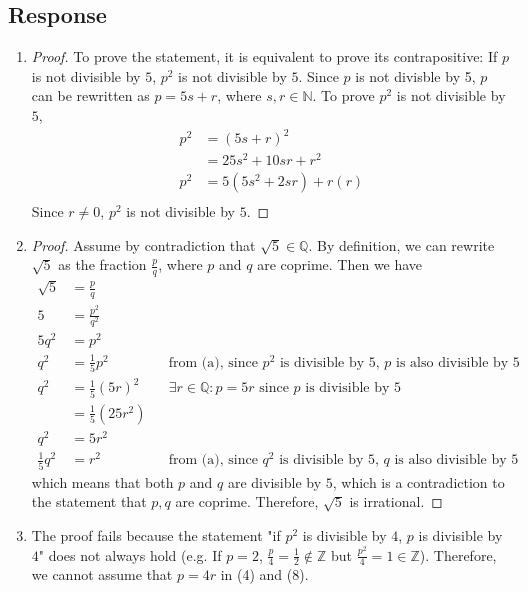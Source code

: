 \documentclass[13pt]{article}
\begin{document}
\subsection*{Response}
\begin{enumerate}[label=(\alph*)]
\item
  \begin{proof}
    To prove the statement, it is equivalent to prove its contrapositive: If $p$ is not divisible by $5$,
    $p^2$ is not divisible by $5$. Since $p$ is not divisble by 5, $p$ can be rewritten as $p = 5s + r$, where
    $s, r \in \mathbb{N}$. To prove $p^2$ is not divisible by $5$,
    \begin{align*}
      p^2 &= (5s + r)^2 \\
          &= 25s^2 + 10sr + r^2 \\
      p^2 &= 5(5s^2 + 2sr) + r(r) \\
    \end{align*}
    Since $r \neq 0$, $p^2$ is not divisible by $5$.
  \end{proof}
\item
  \begin{proof}
    Assume by contradiction that $\sqrt{5} \in \mathbb{Q}$. By definition,
    we can rewrite $\sqrt{5}$ as the fraction $\frac{p}{q}$, where $p$ and $q$ are coprime. Then we have
    \begin{align}
      \sqrt{5} &= \frac{p}{q} \\
      5 &= \frac{p^2}{q^2} \\
      5q^2 &= p^2 \\
      q^2 &= \frac{1}{5}p^2 && \text{from (a), since $p^2$ is divisible by 5, $p$ is also divisible by
                               5} \\
      q^2 &= \frac{1}{5}(5r)^2 && \exists r \in \mathbb{Q} : p = 5r \text{ since $p$ is divisible by 5} \\
               &= \frac{1}{5}(25r^2) \\
      q^2 &= 5r^2 \\
      \frac{1}{5}q^2 &= r^2 && \text{from (a), since $q^2$ is divisible by 5, $q$ is also divisible by
                               5}
    \end{align}
    which means that both $p$ and $q$ are divisible by $5$, which is a contradiction to the statement that
    $p, q$ are coprime. Therefore, $\sqrt{5}$ is irrational.
  \end{proof}
\item The proof fails because the statement "if $p^2$ is divisible by $4$, $p$ is divisible by $4$"
  does not always hold (e.g. If $p = 2$, $\frac{p}{4} = \frac{1}{2} \not\in \mathbb{Z}$ but $\frac{p^2}{4} = 1
  \in \mathbb{Z}$). Therefore, we cannot assume that $p = 4r$ in (4) and (8).
\end{enumerate}
\end{document}
